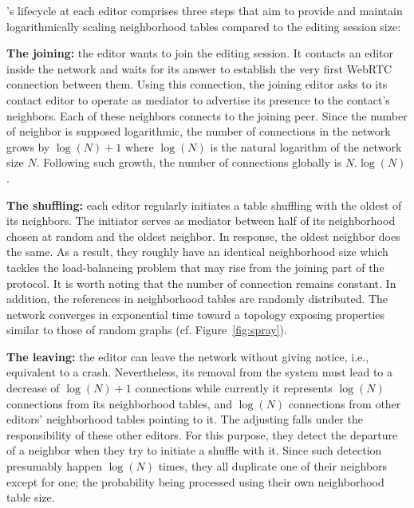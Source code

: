 \SPRAY's lifecycle at each editor comprises three steps that aim to provide and
maintain logarithmically scaling neighborhood tables compared to the editing
session size:
\begin{asparadesc}
\item [\textbf{The joining:}] the editor wants to join the editing session. It
  contacts an editor inside the network and waits for its answer to establish
  the very first WebRTC connection between them. Using this connection, the
  joining editor asks to its contact editor to operate as mediator to advertise
  its presence to the contact's neighbors. Each of these neighbors connects to
  the joining peer. Since the number of neighbor is supposed logarithmic, the
  number of connections in the network grows by $\log(N)+1$ where $\log(N)$ is
  the natural logarithm of the network size $N$. Following such growth, the
  number of connections globally is $N.\log(N)$.
\item [\textbf{The shuffling:}] each editor regularly initiates a table
  shuffling with the oldest of its neighbors. The initiator serves as mediator
  between half of its neighborhood chosen at random and the oldest neighbor. In
  response, the oldest neighbor does the same. As a result, they roughly have an
  identical neighborhood size which tackles the load-balancing problem that may
  rise from the joining part of the protocol. It is worth noting that the number
  of connection remains constant. In addition, the references in neighborhood
  tables are randomly distributed. The network converges in exponential time
  toward a topology exposing properties similar to those of random
  graphs (cf. Figure~\ref{fig:spray}).
\item [\textbf{The leaving:}] the editor can leave the network without giving
  notice, i.e., equivalent to a crash. Nevertheless, its removal from the system
  must lead to a decrease of $\log(N)+1$ connections while currently it
  represents $\log(N)$ connections from its neighborhood tables, and $\log(N)$
  connections from other editors' neighborhood tables pointing to it. The
  adjusting falls under the responsibility of these other editors. For this
  purpose, they detect the departure of a neighbor when they try to initiate a
  shuffle with it. Since such detection presumably happen $\log(N)$ times, they
  all duplicate one of their neighbors except for one; the probability being
  processed using their own neighborhood table size. 
\end{asparadesc}

